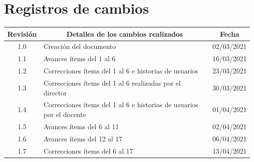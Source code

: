 \documentclass[11pt]{charter}
\begin{document}
\maketitle
\thispagestyle{empty}
\pagebreak


\thispagestyle{empty}
{\setlength{\parskip}{0pt}
\tableofcontents{}
}
\pagebreak

\section*{Registros de cambios}
\label{sec:registro}


\begin{table}[ht]
\label{tab:registro}
\centering
\begin{tabularx}{\linewidth}{@{}|c|X|c|@{}}
\hline
\rowcolor[HTML]{C0C0C0} 
Revisión & \multicolumn{1}{c|}{\cellcolor[HTML]{C0C0C0}Detalles de los cambios realizados} 	& Fecha      \\ \hline
1.0      & Creación del documento                                          									& 02/03/2021 \\ \hline
1.1      & Avances ítems del 1 al 6	                                         								& 16/03/2021 \\ \hline
1.2      & Correcciones ítems del 1 al 6 e historias de usuarios 														& 23/03/2021 \\ \hline
1.3      & Correcciones ítems del 1 al 6 realizadas por el director 												& 30/03/2021 \\ \hline
1.4      & Correcciones ítems del 1 al 6 e historias de usuarios por el docente 						& 01/04/2021 \\ \hline
1.5      & Avances ítems del 6 al 11	 																											& 02/04/2021 \\ \hline
1.6      & Avances ítems del 12 al 17	 																											& 06/04/2021 \\ \hline
1.7      & Correcciones ítems del 6 al 17 													 												& 13/04/2021 \\ \hline

\end{tabularx}
\end{table}
\end{document}
